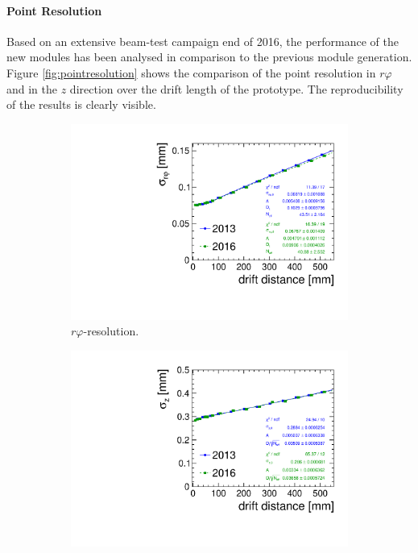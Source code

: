 \paragraph{Point Resolution}

Based on an extensive beam-test campaign end of 2016, the performance of the new modules has been analysed in comparison to the previous module generation.
Figure \ref{fig:pointresolution} shows the comparison of the point resolution in $r\varphi$ and in the $z$ direction over the drift length of the prototype. The reproducibility of the results is clearly visible.

\begin{figure}
\begin{subfigure}[b]{0.48\textwidth}
\includegraphics[width=\textwidth]{Tracker/TPC_Bonn/plots/TPC-DG_rphiResolution_combi_fit_global.pdf}
\caption{$r\varphi$-resolution.}
\label{sfig:pres_13-16_rphi}
\end{subfigure}
\hfill
\begin{subfigure}[b]{0.48\textwidth}
\includegraphics[width=\textwidth]{Tracker/TPC_Bonn/plots/TPC-DG_zResolution_combi_fit.pdf}

\end{subfigure}
\end{figure}
